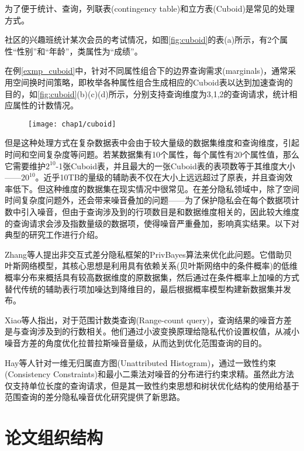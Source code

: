 为了便于统计、查询，列联表(contingency table)和立方表(Cuboid)是常见的处理方式。
\begin{exmp}
	\label{exmp_cuboid}
	社区的兴趣班统计某次会员的考试情况，如图\ref{fig:cuboid}的表(a)所示，有2个属性“性别”和“年龄”，类属性为“成绩”。
\end{exmp}
在例\ref{exmp_cuboid}中，针对不同属性组合下的边界查询需求(marginals\cite{marginals})，通常采用空间换时间策略，即枚举各种属性组合生成相应的Cuboid表以达到加速查询的目的，如\ref{fig:cuboid}(b)(c)(d)所示，分别支持查询维度为3,1,2的查询请求，统计相应属性的计数情况。

\begin{figure}[!htp]
	\centering
	\texttt{[image: chap1/cuboid]}
\end{figure}

但是这种处理方式在复杂数据表中会由于较大量级的数据集维度和查询维度，引起时间和空间复杂度等问题。若某数据集有10个属性，每个属性有20个属性值，那么它需要维护$2^{10}$-1张Cuboid表，并且最大的一张Cuboid表的表项数等于其维度大小——$20^{10}$。近乎10TB的量级的辅助表不仅在大小上远远超过了原表，并且查询效率低下。但这种维度的数据集在现实情况中很常见。在差分隐私领域中，除了空间时间复杂度问题外，还会带来噪音叠加的问题——为了保护隐私会在每个数据项计数中引入噪音，但由于查询涉及到的行项数目是和数据维度相关的，因此较大维度的查询请求会涉及指数量级的数据项，使得噪音严重叠加，影响真实结果。以下对典型的研究工作进行介绍。

Zhang\cite{privbayes}等人提出非交互式差分隐私框架的PrivBayes算法来优化此问题。它借助贝叶斯网络模型，其核心思想是利用具有依赖关系(贝叶斯网络中的条件概率)的低维概率分布来概括具有较高数据维度的原数据集，然后通过在条件概率上加噪的方式替代传统的辅助表行项加噪达到降维目的，最后根据概率模型构建新数据集并发布。

Xiao\cite{wavelet}等人指出，对于范围计数类查询(Range-count query)，查询结果的噪音方差是与查询涉及到的行数相关。他们通过小波变换原理给隐私代价设置权值，从减小噪音方差的角度优化拉普拉斯噪音量级，从而达到优化范围查询的目的。

Hay\cite{boosting}等人针对一维无归属直方图(Unattributed Histogram)，通过一致性约束(Consistency Constraints)和最小二乘法对噪音的分布进行约束求精。虽然此方法仅支持单位长度的查询请求，但是其一致性约束思想和树状优化结构的使用给基于范围查询的差分隐私噪音优化研究提供了新思路。

\section{论文组织结构}

